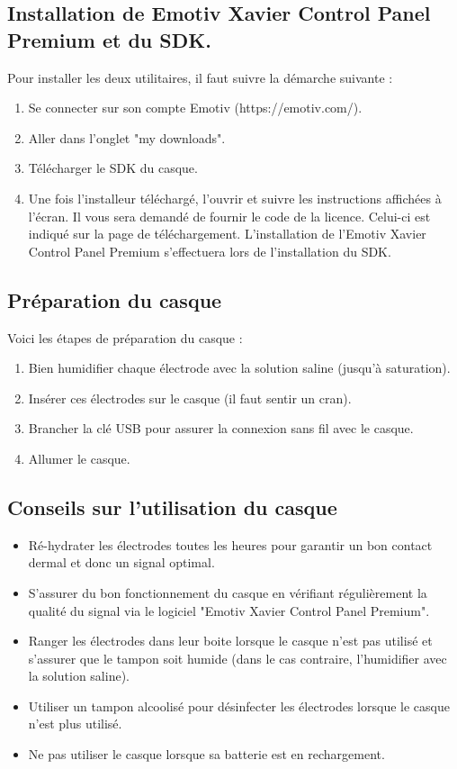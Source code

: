 \subsection {Installation de Emotiv Xavier Control Panel Premium et du SDK.}
\label{Subsection : 5.Installation de Emotiv Xavier Control Panel Premier et du SDK}
Pour installer les deux utilitaires, il faut suivre la démarche suivante : 
\smallbreak
\begin{enumerate}
	\item Se connecter sur son compte Emotiv (https://emotiv.com/).
	\item Aller dans l'onglet "my downloads".
	\item Télécharger le SDK du casque.
	\item Une fois l'installeur téléchargé, l'ouvrir et suivre les instructions affichées à l'écran. Il vous sera demandé de fournir le code de la licence. Celui-ci est indiqué sur la page de téléchargement. L'installation de l'Emotiv Xavier Control Panel Premium s'effectuera lors de l'installation du SDK.
\end{enumerate}

\subsection {Préparation du casque}
\label{Subsection : 5.Préparation du casque}
Voici les étapes de préparation du casque : 
\smallbreak
\begin{enumerate}
	\item Bien humidifier chaque électrode avec la solution saline (jusqu’à saturation).
	\item Insérer ces électrodes sur le casque (il faut sentir un cran).
	\item Brancher la clé USB pour assurer la connexion sans fil avec le casque.
	\item Allumer le casque.
\end{enumerate}

\subsection {Conseils sur l'utilisation du casque}
\label{Subsection : 5.Conseils sur l'utilisation du casque}
\begin{itemize}
	\item Ré-hydrater les électrodes toutes les heures pour garantir un bon contact dermal et donc un signal optimal.
	\smallbreak
	\item S’assurer du bon fonctionnement du casque en vérifiant régulièrement la qualité du signal via le logiciel "Emotiv Xavier Control Panel Premium".
	\smallbreak
	\item Ranger les électrodes dans leur boite lorsque le casque n’est pas utilisé et s’assurer que le tampon soit humide (dans le cas contraire, l’humidifier avec la solution saline).
	\smallbreak
	\item Utiliser un tampon alcoolisé pour désinfecter les électrodes lorsque le casque n'est plus utilisé.
	\smallbreak
	\item Ne pas utiliser le casque lorsque sa batterie est en rechargement.
\end{itemize}

